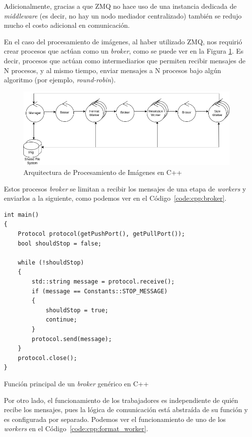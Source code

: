 \documentclass[11pt]{article}
\newcommand{\english}[1]{\textit{#1}}
\begin{document}
Adicionalmente, gracias a que ZMQ no hace uso de una instancia dedicada de \english{middleware} (es decir, no hay un nodo mediador centralizado) también se redujo mucho el costo adicional en comunicación.

En el caso del procesamiento de imágenes, al haber utilizado ZMQ, nos requirió crear procesos que actúan como un \english{broker}, como se puede ver en la Figura \ref{fig:cpp:image_processing_arch}. Es decir, procesos que actúan como intermediarios que permiten recibir mensajes de N procesos, y al mismo tiempo, enviar mensajes a N procesos bajo algún algoritmo (por ejemplo, \english{round-robin}).

\begin{figure}[ht]
    \centering
    \includegraphics[scale=0.4]{resources/distributed_systems/cpp/image_processing_arch.png}
    \caption{Arquitectura de Procesamiento de Imágenes en C++}
    \label{fig:cpp:image_processing_arch}
\end{figure}

Estos procesos \english{broker} se limitan a recibir los mensajes de una etapa de \english{workers} y enviarlos a la siguiente, como podemos ver en el Código~\ref{code:cpp:broker}.

\begin{listing}[ht]
\begin{verbatim}
int main()
{
    Protocol protocol(getPushPort(), getPullPort());
    bool shouldStop = false;

    while (!shouldStop)
    {
        std::string message = protocol.receive();
        if (message == Constants::STOP_MESSAGE)
        {
            shouldStop = true;
            continue;
        }
        protocol.send(message);
    }
    protocol.close();
}
\end{verbatim}
\caption{Función principal de un \english{broker} genérico en C++}
\label{code:cpp:broker}
\end{listing}

Por otro lado, el funcionamiento de los trabajadores es independiente de quién recibe los mensajes, pues la lógica de comunicación está abstraída de su función y es configurada por separado. Podemos ver el funcionamiento de uno de los \english{workers} en el Código~\ref{code:cpp:format_worker}.
\end{document}
